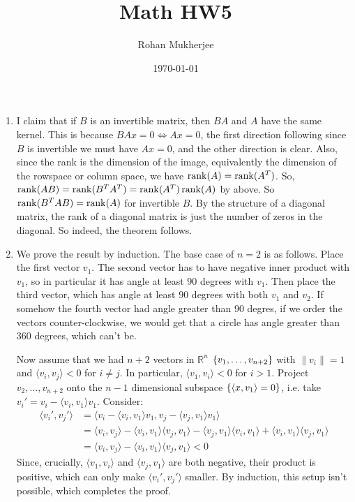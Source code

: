 \documentclass[12pt]{article}
\title{Math HW5}
\date{\today}
\author{Rohan Mukherjee}
\theoremstyle{definitionstyle}
\def\mbb#1{\mathbb{#1}}
\def\R{\mbb{R}}
\newcommand{\mg}[1]{\| #1 \|}
\renewcommand{\ip}[1]{\langle#1\rangle}
\newcommand{\SET}[1]{\Set{\mskip-\medmuskip #1 \mskip-\medmuskip}}
\newcommand{\1}{\mathds 1}
\begin{document}
    \maketitle
    \begin{enumerate}
        \item I claim that if $B$ is an invertible matrix, then $BA$ and $A$ have the same kernel. This is because $BAx = 0 \iff Ax = 0$, the first direction following since $B$ is invertible we must have $Ax = 0$, and the other direction is clear. Also, since the rank is the dimension of the image, equivalently the dimension of the rowspace or column space, we have $\rank(A) = \rank(A^T)$. So, $\rank(AB) = \rank(B^TA^T) = \rank(A^T) \rank(A)$ by above. So $\rank(B^TAB) = \rank(A)$ for invertible $B$. By the structure of a diagonal matrix, the rank of a diagonal matrix is just the number of zeros in the diagonal. So indeed, the theorem follows.

        \item We prove the result by induction. The base case of $n=2$ is as follows. Place the first vector $v_1$. The second vector has to have negative inner product with $v_1$, so in particular it has angle at least $90$ degrees with $v_1$. Then place the third vector, which has angle at least $90$ degrees with both $v_1$ and $v_2$. If somehow the fourth vector had angle greater than 90 degres, if we order the vectors counter-clockwise, we would get that a circle has angle greater than 360 degrees, which can't be.

        Now assume that we had $n+2$ vectors in $\R^n$ $\SET{v_1, \ldots, v_{n+2}}$ with $\mg{v_i} = 1$ and $\ip{v_i, v_j} < 0$ for $i \neq j$. In particular, $\ip{v_1, v_i} < 0$ for $i > 1$. Project $v_2, \ldots, v_{n+2}$ onto the $n-1$ dimensional subspace $\SET{\ip{x,v_1} = 0}$, i.e. take $v_i' = v_i - \ip{v_i, v_1}v_1$. Consider:
        \begin{align*}            \ip{v_i',v_j'} &= \ip{v_i - \ip{v_i, v_1}v_1, v_j - \ip{v_j, v_1}v_1} 
            \\&= \ip{v_i, v_j} - \ip{v_i, v_1}\ip{v_j, v_1} - \ip{v_j, v_1}\ip{v_i, v_1} + \ip{v_i, v_1}\ip{v_j, v_1} 
            \\&= \ip{v_i, v_j} - \ip{v_i, v_1}\ip{v_j, v_1} < 0
        \end{align*}
        Since, crucially, $\ip{v_1, v_i}$ and $\ip{v_j, v_1}$ are both negative, their product is positive, which can only make $\ip{v_i', v_j'}$ smaller. By induction, this setup isn't possible, which completes the proof.


\end{enumerate}
\end{document}
